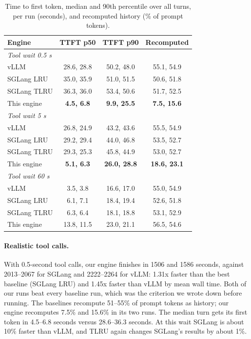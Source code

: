\documentclass[11pt]{article}
\begin{document}
\begin{table}[t]
\centering
\caption{Time to first token, median and 90th percentile over all turns, per run (seconds), and recomputed history (\% of prompt tokens).}
\label{tab:ttft}
\begin{tabular}{lccc}
\toprule
Engine & TTFT p50 & TTFT p90 & Recomputed \\
\midrule
\multicolumn{4}{l}{\emph{Tool wait 0.5 s}} \\
vLLM & 28.6, 28.8 & 50.2, 48.0 & 55.1, 54.9 \\
SGLang LRU & 35.0, 35.9 & 51.0, 51.5 & 50.6, 51.8 \\
SGLang TLRU & 36.3, 36.0 & 53.4, 50.6 & 51.7, 52.5 \\
This engine & \textbf{4.5, 6.8} & \textbf{9.9, 25.5} & \textbf{7.5, 15.6} \\
\midrule
\multicolumn{4}{l}{\emph{Tool wait 5 s}} \\
vLLM & 26.8, 24.9 & 43.2, 43.6 & 55.5, 54.9 \\
SGLang LRU & 29.2, 29.4 & 44.0, 46.8 & 53.5, 52.7 \\
SGLang TLRU & 29.3, 25.3 & 45.8, 44.9 & 53.0, 52.7 \\
This engine & \textbf{5.1, 6.3} & \textbf{26.0, 28.8} & \textbf{18.6, 23.1} \\
\midrule
\multicolumn{4}{l}{\emph{Tool wait 60 s}} \\
vLLM & 3.5, 3.8 & 16.6, 17.0 & 55.0, 54.9 \\
SGLang LRU & 6.1, 7.1 & 18.4, 19.4 & 52.6, 51.8 \\
SGLang TLRU & 6.3, 6.4 & 18.1, 18.8 & 53.1, 52.9 \\
This engine & 13.8, 11.5 & 23.0, 21.1 & 56.5, 54.6 \\
\bottomrule
\end{tabular}
\end{table}

\paragraph{Realistic tool calls.} With 0.5-second tool calls, our engine finishes in 1506 and 1586 seconds, against 2013--2067 for SGLang and 2222--2264 for vLLM: 1.31x faster than the best baseline (SGLang LRU) and 1.45x faster than vLLM by mean wall time. Both of our runs beat every baseline run, which was the criterion we wrote down before running. The baselines recompute 51--55\% of prompt tokens as history; our engine recomputes 7.5\% and 15.6\% in its two runs. The median turn gets its first token in 4.5--6.8 seconds versus 28.6--36.3 seconds. At this wait SGLang is about 10\% faster than vLLM, and TLRU again changes SGLang's results by about 1\%.
\end{document}
